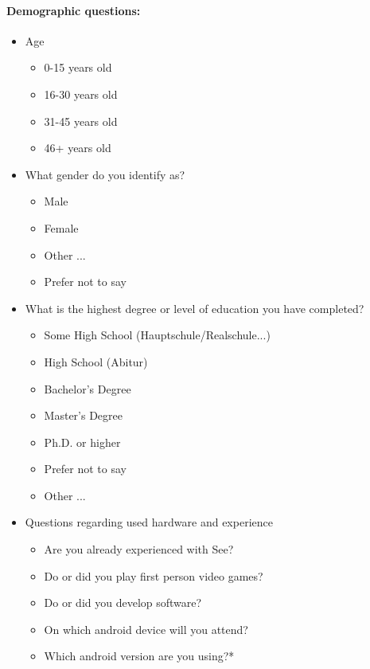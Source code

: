 \paragraph{Demographic questions:}
\begin{itemize}
  \item Age
        \begin{itemize}
          \item 0-15 years old
          \item 16-30 years old
          \item 31-45 years old
          \item 46+ years old
        \end{itemize}
  \item What gender do you identify as?
        \begin{itemize}
          \item Male
          \item Female
          \item Other ...
          \item Prefer not to say
        \end{itemize}
  \item What is the highest degree or level of education you have completed?
        \begin{itemize}
          \item Some High School (Hauptschule/Realschule...)
          \item High School (Abitur)
          \item Bachelor's Degree
          \item Master's Degree
          \item Ph.D. or higher
          \item Prefer not to say
          \item Other ...
        \end{itemize}
  \item Questions regarding used hardware and experience
        \begin{itemize}
          \item Are you already experienced with See?
          \item Do or did you play first person video games?
          \item Do or did you develop software?
          \item On which \gls{android} device will you attend?
          \item Which \gls{android} version are you using?*
        \end{itemize}
\end{itemize}


